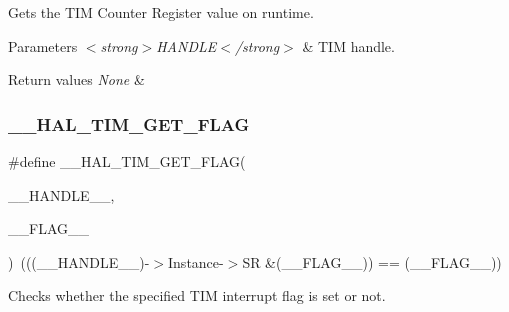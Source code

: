 Gets the T\+IM Counter Register value on runtime. 


\begin{DoxyParams}{Parameters}
{\em $<$strong$>$\+H\+A\+N\+D\+L\+E$<$/strong$>$} & T\+IM handle. \\
\hline
\end{DoxyParams}

\begin{DoxyRetVals}{Return values}
{\em None} & \\
\hline
\end{DoxyRetVals}
\mbox{\label{group___t_i_m___exported___macros_ga96d98c66ad9d85f00c148de99888ef19}} 
\subsubsection{\texorpdfstring{\+\_\+\+\_\+\+H\+A\+L\+\_\+\+T\+I\+M\+\_\+\+G\+E\+T\+\_\+\+F\+L\+AG}{\_\_HAL\_TIM\_GET\_FLAG}}
{\footnotesize\ttfamily \#define \+\_\+\+\_\+\+H\+A\+L\+\_\+\+T\+I\+M\+\_\+\+G\+E\+T\+\_\+\+F\+L\+AG(\begin{DoxyParamCaption}\item[{}]{\+\_\+\+\_\+\+H\+A\+N\+D\+L\+E\+\_\+\+\_\+,  }\item[{}]{\+\_\+\+\_\+\+F\+L\+A\+G\+\_\+\+\_\+ }\end{DoxyParamCaption})~(((\+\_\+\+\_\+\+H\+A\+N\+D\+L\+E\+\_\+\+\_\+)-\/$>$Instance-\/$>$SR \&(\+\_\+\+\_\+\+F\+L\+A\+G\+\_\+\+\_\+)) == (\+\_\+\+\_\+\+F\+L\+A\+G\+\_\+\+\_\+))}



Checks whether the specified T\+IM interrupt flag is set or not. 



